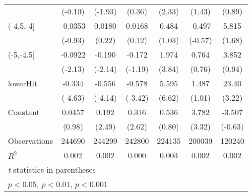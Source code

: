 {\begin{tabular}{l*{6}{c}}
                    &     (-0.10)         &     (-1.93)         &      (0.36)         &      (2.33)         &      (1.43)         &      (0.89)         \\
[1em]
(-4.5,-4]           &     -0.0353         &      0.0180         &      0.0168         &       0.484         &      -0.497         &       5.815         \\
                    &     (-0.93)         &      (0.22)         &      (0.12)         &      (1.03)         &     (-0.57)         &      (1.68)         \\
[1em]
(-5,-4.5]           &     -0.0922\sym{*}  &      -0.190\sym{*}  &      -0.172         &       1.974\sym{***}&       0.764         &       3.852         \\
                    &     (-2.13)         &     (-2.14)         &     (-1.19)         &      (3.84)         &      (0.76)         &      (0.94)         \\
[1em]
lowerHit            &      -0.334\sym{***}&      -0.556\sym{***}&      -0.578\sym{***}&       5.595\sym{***}&       1.487         &       23.40\sym{**} \\
                    &     (-4.63)         &     (-4.14)         &     (-3.42)         &      (6.62)         &      (1.01)         &      (3.22)         \\
[1em]
Constant            &      0.0457         &       0.192\sym{*}  &       0.316\sym{**} &       0.536         &       3.782\sym{***}&      -3.507         \\
                    &      (0.98)         &      (2.49)         &      (2.62)         &      (0.80)         &      (3.32)         &     (-0.63)         \\
\hline
Observations        &      244690         &      244299         &      242800         &      224135         &      200039         &      120240         \\
\(R^{2}\)           &       0.002         &       0.002         &       0.000         &       0.003         &       0.002         &       0.002         \\
\hline\hline
\multicolumn{7}{l}{\footnotesize \textit{t} statistics in parentheses}\\
\multicolumn{7}{l}{\footnotesize \sym{*} \(p<0.05\), \sym{**} \(p<0.01\), \sym{***} \(p<0.001\)}\\
\end{tabular}
}
